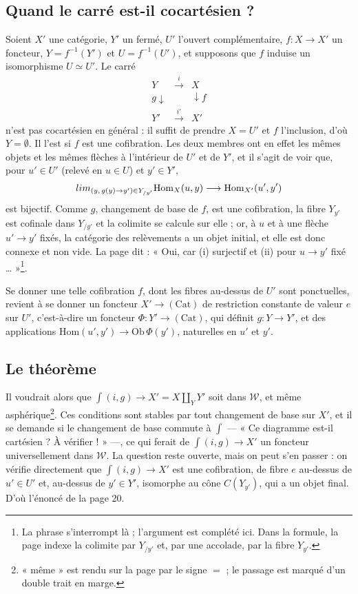 \documentclass[11pt,a4paper]{article}
\begin{document}
\subsection*{Quand le carré est-il cocartésien ?}

Soient $X'$ une catégorie, $Y'$ un fermé, $U'$ l'ouvert complémentaire,
$f : X \to X'$ un foncteur, $Y = f^{-1}(Y')$ et $U = f^{-1}(U')$, et supposons
que $f$ induise un isomorphisme $U \simeq U'$. Le carré
\[
\begin{array}{ccc}
Y & \xrightarrow{\ i\ } & X \\
{\scriptstyle g}\downarrow & & \downarrow{\scriptstyle f} \\
Y' & \xrightarrow{\ i'\ } & X'
\end{array}
\]
n'est pas cocartésien en général : il suffit de prendre $X = U'$ et $f$
l'inclusion, d'où $Y = \emptyset$. Il l'est si $f$ est une cofibration. Les
deux membres ont en effet les mêmes objets et les mêmes flèches à l'intérieur
de $U'$ et de $Y'$, et il s'agit de voir que, pour $u' \in U'$ (relevé en
$u \in U$) et $y' \in Y'$,
\[
\varinjlim_{(y,\, g(y) \to y') \in Y_{/y'}} \mathrm{Hom}_{X}(u, y)
\longrightarrow \mathrm{Hom}_{X'}(u', y')
\]
est bijectif. Comme $g$, changement de base de $f$, est une cofibration, la
fibre $Y_{y'}$ est cofinale dans $Y_{/y'}$ et la colimite se calcule sur
elle ; or, à $u$ et à une flèche $u' \to y'$ fixés, la catégorie des
relèvements a un objet initial, et elle est donc connexe et non vide. La page
dit : « Oui, car (i) surjectif et (ii) pour $u \to y'$ fixé
… »\footnote{La phrase s'interrompt là ; l'argument est complété ici.
Dans la formule, la page indexe la colimite par $Y_{/y'}$ et, par une
accolade, par la fibre $Y_{y'}$.}.

Se donner une telle cofibration $f$, dont les fibres au-dessus de $U'$ sont
ponctuelles, revient à se donner un foncteur $X' \to (\mathrm{Cat})$ de
restriction constante de valeur $e$ sur $U'$, c'est-à-dire un foncteur
$\Phi : Y' \to (\mathrm{Cat})$, qui définit $g : Y \to Y'$, et des
applications $\mathrm{Hom}(u', y') \to \mathrm{Ob}\,\Phi(y')$, naturelles en
$u'$ et $y'$.

\subsection*{Le théorème}

Il voudrait alors que $\int(i, g) \to X' = X \amalg_{Y} Y'$ soit dans
$\mathcal{W}$, et même asphérique\footnote{« même » est rendu sur la page par
le signe $=$ ; le passage est marqué d'un double trait en marge.}. Ces
conditions sont stables par tout changement de base sur $X'$, et il se demande
si le changement de base commute à $\int$ --- « Ce diagramme est-il
cartésien ? À vérifier ! » ---, ce qui ferait de $\int(i, g) \to X'$ un
foncteur universellement dans $\mathcal{W}$. La question reste ouverte, mais
on peut s'en passer : on vérifie directement que $\int(i, g) \to X'$ est une
cofibration, de fibre $e$ au-dessus de $u' \in U'$ et, au-dessus de
$y' \in Y'$, isomorphe au cône $C(Y_{y'})$, qui a un objet final. D'où
l'énoncé de la page 20.
\end{document}
